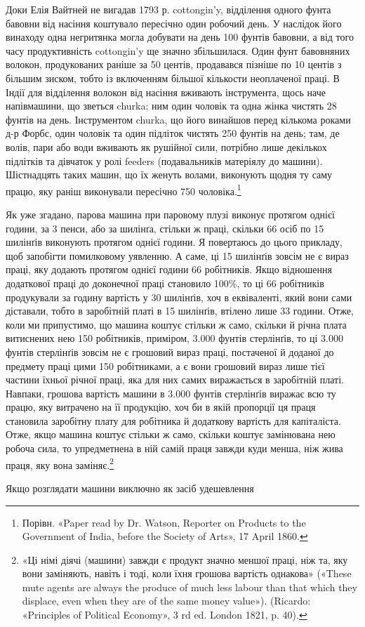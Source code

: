 \parcont{}  %
Доки Елія Вайтней не вигадав 1793 р. cottongin’y, відділення одного
фунта бавовни від насіння коштувало пересічно один робочий
день. У наслідок його винаходу одна негритянка могла добувати
на день 100 фунтів бавовни, а від того часу продуктивність cottongin’y
ще значно збільшилася. Один фунт бавовняних волокон,
продукованих раніше за 50 центів, продавався пізніше по
10 центів з більшим зиском, тобто із включенням більшої кількости
неоплаченої праці. В Індії для відділення волокон від насіння
вживають інструмента, щось наче напівмашини, що зветься
churka; ним один чоловік та одна жінка чистять 28 фунтів на день.
Інструментом churka, що його винайшов перед кількома роками д-р Форбс, один чоловік та один підліток
чистять 250 фунтів на
день; там, де волів, пари або води вживають як рушійної сили,
потрібно лише декількох підлітків та дівчаток у ролі feeders
(подавальників матеріялу до машини). Шістнадцять таких машин,
що їх женуть волами, виконують щодня ту саму працю, яку раніш
виконували пересічно 750 чоловіка.\footnote{
Порівн. «Paper read by Dr. Watson, Reporter on Products to the
Government of India, before the Society of Arts», 17 April 1860.
}

Як уже згадано, парова машина при паровому плузі виконує
протягом однієї години, за 3 пенси, або за  шилінґа, стільки ж
праці, скільки 66 осіб по 15 шилінґів виконують протягом однієї
години. Я повертаюсь до цього прикладу, щоб запобігти помилковому
уявленню. А саме, ці 15 шилінґів зовсім не є вираз праці, яку
додають протягом однієї години 66 робітників. Якщо відношення
додаткової праці до доконечної праці становило 100\%, то ці
66 робітників продукували за годину вартість у 30 шилінґів,
хоч в еквіваленті, який вони сами діставали, тобто в заробітній
платі в 15 шилінґів, втілено лише 33 години. Отже, коли ми припустимо,
що машина коштує стільки ж само, скільки й річна
плата витиснених нею 150 робітників, приміром, 3.000 фунтів
стерлінґів, то ці 3.000 фунтів стерлінґів зовсім не є грошовий
вираз праці, постаченої й доданої до предмету праці цими 150 робітниками,
а є вони грошовий вираз лише тієї частини їхньої
річної праці, яка для них самих виражається в заробітній платі.
Навпаки, грошова вартість машини в 3.000 фунтів стерлінґів
виражає всю ту працю, яку витрачено на її продукцію, хоч би
в якій пропорції ця праця становила заробітну плату для
робітника й додаткову вартість для капіталіста. Отже, якщо
машина коштує стільки ж само, скільки коштує замінювана нею
робоча сила, то упредметнена в ній самій праця завжди куди
менша, ніж жива праця, яку вона заміняє.\footnote{
«Ці німі діячі (машини) завжди є продукт значно меншої праці,
ніж та, яку вони заміняють, навіть і тоді, коли їхня грошова вартість
однакова» («These mute agents are always the produce of much less labour
than that which they displace, even when they are of the same money
value»). (Ricardo: «Principles of Political Economy», 3 rd ed. London
1821, p. 40).
}

Якщо розглядати машини виключно як засіб удешевлення
\parbreak{}  %
